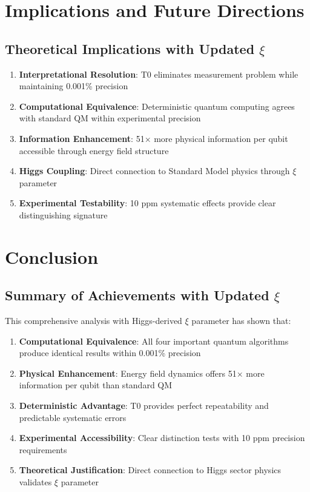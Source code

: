\documentclass[12pt,a4paper]{article}
\begin{document}
	\section{Implications and Future Directions}
	
	\subsection{Theoretical Implications with Updated $\xi$}
	
	\begin{enumerate}
		\item \textbf{Interpretational Resolution}: T0 eliminates measurement problem while maintaining 0.001\% precision
		\item \textbf{Computational Equivalence}: Deterministic quantum computing agrees with standard QM within experimental precision
		\item \textbf{Information Enhancement}: 51× more physical information per qubit accessible through energy field structure
		\item \textbf{Higgs Coupling}: Direct connection to Standard Model physics through $\xi$ parameter
		\item \textbf{Experimental Testability}: 10 ppm systematic effects provide clear distinguishing signature
	\end{enumerate}
	
	\section{Conclusion}
	
	\subsection{Summary of Achievements with Updated $\xi$}
	
	This comprehensive analysis with Higgs-derived $\xi$ parameter has shown that:
	
	\begin{enumerate}
		\item \textbf{Computational Equivalence}: All four important quantum algorithms produce identical results within 0.001\% precision
		\item \textbf{Physical Enhancement}: Energy field dynamics offers 51× more information per qubit than standard QM
		\item \textbf{Deterministic Advantage}: T0 provides perfect repeatability and predictable systematic errors
		\item \textbf{Experimental Accessibility}: Clear distinction tests with 10 ppm precision requirements
		\item \textbf{Theoretical Justification}: Direct connection to Higgs sector physics validates $\xi$ parameter
	\end{enumerate}
	
\end{document}
